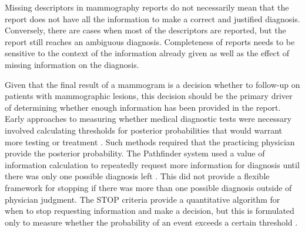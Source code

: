 Missing descriptors in mammography reports do not necessarily mean that the report does not have all the information to make a correct and justified diagnosis. Conversely, there are cases when most of the descriptors are reported, but the report still reaches an ambiguous diagnosis. Completeness of reports needs to be sensitive to the context of the information already given as well as the effect of missing information on the diagnosis. 

Given that the final result of a mammogram is a decision whether to follow-up on patients with mammographic lesions, this decision should be the primary driver of determining whether enough information has been provided in the report. Early approaches to measuring whether medical diagnostic tests were necessary involved calculating thresholds for posterior probabilities that would warrant more testing or treatment \cite{Pauker:1980cg}. Such methods required that the practicing physician provide the posterior probability. The Pathfinder system used a value of information calculation to repeatedly request more information for diagnosis until there was only one possible diagnosis left \cite{Heckerman:1992uq}. This did not provide a flexible framework for stopping if there was more than one possible diagnosis outside of physician judgment. The STOP criteria provide a quantitative algorithm for when to stop requesting information and make a decision, but this is formulated only to measure whether the probability of an event exceeds a certain threshold \cite{Gaag:2011gs}.